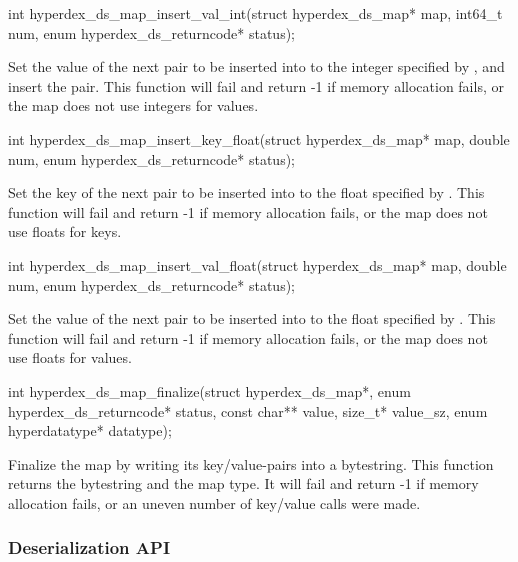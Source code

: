 \funcsep
\begin{ccode}
int hyperdex_ds_map_insert_val_int(struct hyperdex_ds_map* map,
                                   int64_t num,
                                   enum hyperdex_ds_returncode* status);
\end{ccode}
\funcdesc Set the value of the next pair to be inserted into  to the
integer specified by , and insert the pair.  This function will fail
and return -1 if memory allocation fails, or the map does not use integers for
values.

\funcsep
\begin{ccode}
int hyperdex_ds_map_insert_key_float(struct hyperdex_ds_map* map,
                                     double num,
                                     enum hyperdex_ds_returncode* status);
\end{ccode}
\funcdesc Set the key of the next pair to be inserted into  to the
float specified by .  This function will fail and return -1 if memory
allocation fails, or the map does not use floats for keys.

\funcsep
\begin{ccode}
int hyperdex_ds_map_insert_val_float(struct hyperdex_ds_map* map,
                                     double num,
                                     enum hyperdex_ds_returncode* status);
\end{ccode}
\funcdesc Set the value of the next pair to be inserted into  to the
float specified by .  This function will fail and return -1 if memory
allocation fails, or the map does not use floats for values.

\funcsep
\begin{ccode}
int hyperdex_ds_map_finalize(struct hyperdex_ds_map*,
                             enum hyperdex_ds_returncode* status,
                             const char** value, size_t* value_sz,
                             enum hyperdatatype* datatype);
\end{ccode}
\funcdesc Finalize the map by writing its key/value-pairs  into a bytestring.
This function returns the bytestring and the map type.  It will fail and return
-1 if memory allocation fails, or an uneven number of key/value calls were made.

\subsubsection{Deserialization API}
\label{sec:api:c:client:deserialize}

